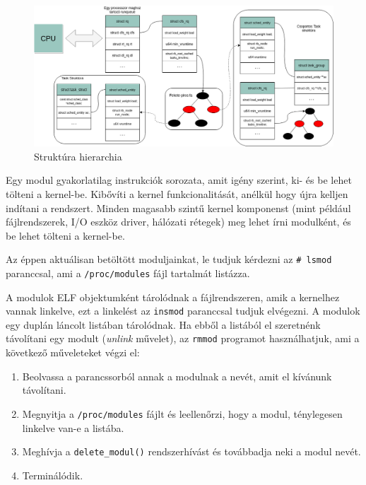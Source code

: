 \begin{figure}[h!]
\centering
\includegraphics[width=\textwidth]{images/structureHierarchy.png}
\caption{Struktúra hierarchia}
\label{fig:structurehierarchi}
\end{figure}



Egy modul gyakorlatilag instrukciók sorozata, amit igény szerint, ki- és be lehet tölteni a kernel-be. Kibővíti a kernel funkcionalitását, anélkül hogy újra kelljen indítani a rendszert. Minden magasabb szintű kernel komponenst (mint például fájlrendszerek, I/O eszköz driver, hálózati rétegek) meg lehet írni modulként, és be lehet tölteni a kernel-be.

Az éppen aktuálisan betöltött moduljainkat, le tudjuk kérdezni az \texttt{\# lsmod} paranccsal, ami a \texttt{/proc/modules} fájl tartalmát listázza.

A modulok ELF objektumként tárolódnak a fájlrendszeren, amik a kernelhez vannak linkelve, ezt a linkelést az \texttt{insmod} paranccsal tudjuk elvégezni.
A modulok egy duplán láncolt listában tárolódnak.
Ha ebből a listából el szeretnénk távolítani egy modult (\textit{unlink} művelet), az \texttt{rmmod} programot használhatjuk, ami a következő műveleteket végzi el:
\begin{enumerate}
	\item Beolvassa a parancssorból annak a modulnak a nevét, amit el kívánunk távolítani.
	\item Megnyitja a \texttt{/proc/modules} fájlt és leellenőrzi, hogy a modul, ténylegesen linkelve van-e a listába.
	\item Meghívja a \texttt{delete\_modul()} rendszerhívást és továbbadja neki a modul nevét.
	\item Terminálódik.
\end{enumerate} 

